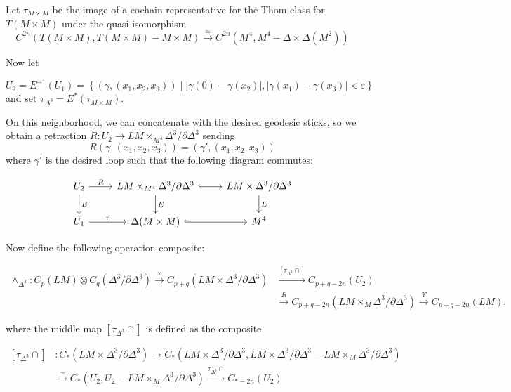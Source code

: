 \documentclass[reqno]{amsart}
\theoremstyle{definition}
\theoremstyle{remark}
\begin{document}
Let
$\tau_{M \times M}$ be the image of a cochain representative
for the Thom class for
$T\left( M \times M \right) $ under
the quasi-isomorphism
\[
C^{2n}\left( T(M \times M), T(M \times M) - M \times M \right) 
\stackrel{\simeq}{\to} 
C^{2n} \left( M^{4}, M^{4} - \Delta \times \Delta(M^2) \right) 
\] 

Now let

\[
    U_{2} = E^{-1}(U_1) = 
    \left\{ \left( \gamma, \left( x_1,x_2,x_3 \right)  \right)  \mid 
    \left| \gamma(0) - \gamma(x_2) \right| ,
    \left| \gamma(x_1)- \gamma(x_3) \right| < \varepsilon \right\} 
\]
and set
$\tau_{\Delta^3} = 
E^{*}(\tau_{M \times M})$.



On this neighborhood, we can concatenate with the desired geodesic sticks,
so we obtain a retraction
$R \colon U_2 \to LM \times_{M^{4}} \Delta^3 / \partial \Delta^3$ sending
\[
R (\gamma, \left( x_1,x_2,x_3 \right) )
= \left( \gamma', \left( x_1,x_2,x_3 \right)  \right) 
\] 
where $\gamma'$ is the desired loop 
such that
the following diagram commutes:

\begin{equation*}
\begin{tikzcd}
    U_2 \ar[d, "E"] \ar[r, "R"] & LM \times_{M^{4}} \Delta^3 / \partial \Delta^3
    \ar[r, hookrightarrow] \ar[d, "E"] & LM \times \Delta^3 / 
    \partial \Delta^3 \ar[d, "E"] \\
    U_1 \ar[r, "r"] & \Delta (M \times M) \ar[r, hookrightarrow] & M^{4}
\end{tikzcd}
\end{equation*}


Now define the following operation composite:

\begin{align*}
    \wedge_{\Delta^3} \colon C_p(LM) \otimes 
    C_q(\Delta^{3} / \partial \Delta^3) \stackrel{\times }{\longrightarrow} 
    C_{p+q}\left( LM \times \Delta^3 / \partial \Delta^3 \right) 
    &\stackrel{\left[ \tau_{\Delta^3} \cap \right] }{\longrightarrow} 
    C_{p+q-2n} (U_2) \\
    &\stackrel{R}{\longrightarrow} C_{p+q-2n}
    \left( LM \times_M \Delta^3 / \partial \Delta^3 \right) 
    \stackrel{\Upsilon}{\longrightarrow} C_{p+q-2n}(LM).
\end{align*}

where the middle map
$\left[ \tau_{\Delta^3} \cap  \right] $ is defined as the composite

\begin{align*}
    \left[ \tau_{\Delta^3}\cap \right] 
    &\colon
C_{*}\left( LM \times \Delta^3 / \partial \Delta^3 \right) 
\to C_{*}\left( LM \times \Delta^3 / \partial \Delta^3 , LM \times \Delta^3 
    / \partial \Delta^3 - 
LM \times_M \Delta^3 / \partial \Delta^3 \right) \\
    &\stackrel{\sim}{\longrightarrow} 
C_* \left( U_2, U_2 - LM \times_M \Delta^3 / \partial \Delta^3 \right) 
         \stackrel{\tau_{\Delta^3} \cap}{\longrightarrow} 
        C_{* - 2n}\left( U_2 \right) 
\end{align*}
\end{document}
